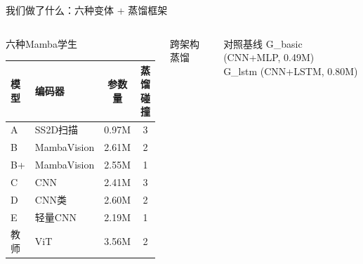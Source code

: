 \documentclass[aspectratio=169,10pt]{beamer}
\newcommand{\HL}[1]{\textcolor{emphasis}{#1}}
\begin{document}
\begin{frame}{我们做了什么：六种变体 + 蒸馏框架}
\begin{columns}[T]
\begin{block}{六种Mamba学生}
\centering\footnotesize
\begin{tabular}{llcc}
\toprule
模型 & 编码器 & 参数量 & 蒸馏碰撞 \\
\midrule
A & SS2D扫描 & 0.97M & 3 \\
B & MambaVision & 2.61M & 2 \\
\HL{B+} & MambaVision & 2.55M & \HL{1} \\
C & CNN & 2.41M & 3 \\
D & CNN类 & 2.60M & 2 \\
\HL{E} & 轻量CNN & 2.19M & \HL{1} \\
\midrule
教师 & ViT & 3.56M & 2 \\
\bottomrule
\end{tabular}
\end{block}

\begin{block}{跨架构蒸馏}
\centering\footnotesize
{}
\end{block}

\begin{block}{对照基线}
\centering\footnotesize
G\_basic (CNN+MLP, 0.49M)\\
G\_lstm (CNN+LSTM, 0.80M)
\end{block}
\end{columns}
\end{frame}
\end{document}
